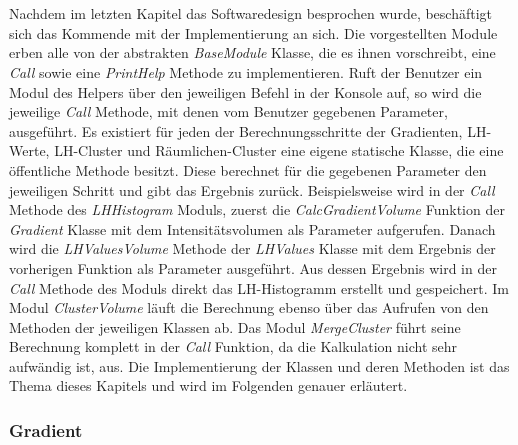 \chapter{}
\label{sec:implementation}




Nachdem im letzten Kapitel das Softwaredesign besprochen wurde, beschäftigt sich das Kommende mit der Implementierung an sich.
\newline
Die vorgestellten Module erben alle von der abstrakten \textit{BaseModule} Klasse, die es ihnen vorschreibt, eine \textit{Call} sowie eine \textit{PrintHelp} Methode zu implementieren.
\newline
Ruft der Benutzer ein Modul des Helpers über den jeweiligen Befehl in der Konsole auf, so wird die jeweilige \textit{Call} Methode, mit denen vom Benutzer gegebenen Parameter, ausgeführt.
\newline
Es existiert für jeden der Berechnungsschritte der Gradienten, LH-Werte, LH-Cluster und Räumlichen-Cluster eine eigene statische Klasse, die eine öffentliche Methode besitzt. Diese berechnet für die gegebenen Parameter den jeweiligen Schritt und gibt das Ergebnis zurück. 
\newline
Beispielsweise wird in der \textit{Call} Methode des \textit{LHHistogram} Moduls, zuerst die \textit{CalcGradientVolume} Funktion der \textit{Gradient} Klasse mit dem Intensitätsvolumen als Parameter aufgerufen. Danach wird die \textit{LHValuesVolume} Methode der \textit{LHValues} Klasse mit dem Ergebnis der vorherigen Funktion als Parameter ausgeführt. Aus dessen Ergebnis wird in der \textit{Call} Methode des Moduls direkt das LH-Histogramm erstellt und gespeichert. Im Modul \textit{ClusterVolume} läuft die Berechnung ebenso über das Aufrufen von den Methoden der jeweiligen Klassen ab.
\newline
Das Modul \textit{MergeCluster} führt seine Berechnung komplett in der \textit{Call} Funktion, da die Kalkulation nicht sehr aufwändig ist, aus.
\newline
Die Implementierung der Klassen und deren Methoden ist das Thema dieses Kapitels und wird im Folgenden genauer erläutert.



\subsection{Gradient}

